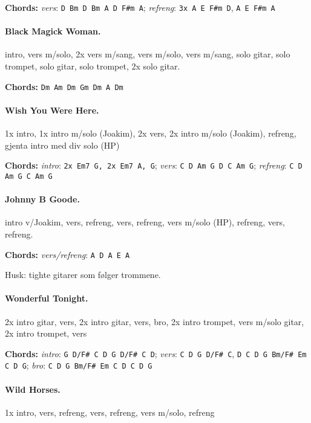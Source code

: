 \documentclass[%
twoside,                 %
final,                   %
10pt]{article}
\begin{document}
\textbf{Chords:} \emph{vers}: \Verb!D Bm D Bm A D F#m A!;
\emph{refreng}: \Verb!3x A E F#m D!, \Verb!A E F#m A!





\paragraph{Black Magick Woman.}
intro, vers m/solo, 2x vers m/sang, vers m/solo, vers m/sang, solo gitar, solo trompet, solo gitar, solo trompet, 2x solo gitar.

\textbf{Chords:} \Verb!Dm Am Dm Gm Dm A Dm!






\paragraph{Wish You Were Here.}
1x intro, 1x intro m/solo (Joakim), 2x vers, 2x intro m/solo (Joakim), refreng,
gjenta intro med div solo (HP)


\textbf{Chords:} \emph{intro}: \Verb!2x Em7 G, 2x Em7 A, G!;
\emph{vers}: \Verb!C D Am G D C Am G!; \emph{refreng}: \Verb!C D Am G C Am G!





\paragraph{Johnny B Goode.}
intro v/Joakim, vers, refreng, vers, refreng, vers m/solo (HP), refreng,
vers, refreng.

\textbf{Chords:} \emph{vers/refreng}: \Verb!A D A E A!

Husk: tighte gitarer som følger trommene.


\paragraph{Wonderful Tonight.}
2x intro gitar, vers, 2x intro gitar, vers, bro, 2x intro trompet, vers m/solo gitar, 2x intro trompet, vers

\textbf{Chords:} \emph{intro}: \Verb!G D/F# C D G D/F# C D!;
\emph{vers}:
\Verb!C D G D/F# C!, \Verb!D C D G Bm/F# Em C D G!;
\emph{bro}: \Verb!C D G Bm/F# Em C D C D G!




\paragraph{Wild Horses.}
1x intro, vers, refreng, vers, refreng, vers m/solo, refreng
\end{document}
